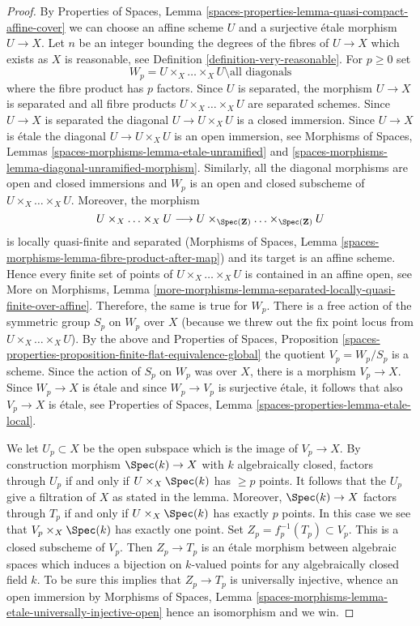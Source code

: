 \begin{proof}
By Properties of Spaces, Lemma
\ref{spaces-properties-lemma-quasi-compact-affine-cover}
we can choose an affine scheme $U$ and a surjective \'etale
morphism $U \to X$. Let $n$ be an integer bounding the degrees of
the fibres of $U \to X$ which exists as $X$ is reasonable, see
Definition \ref{definition-very-reasonable}.
For $p \geq 0$ set
$$
W_p = U \times_X \ldots \times_X U \setminus \text{all diagonals}
$$
where the fibre product has $p$ factors. Since $U$ is separated,
the morphism $U \to X$ is separated and all fibre products
$U \times_X \ldots \times_X U$ are separated schemes. Since $U \to X$ is
separated the diagonal $U \to U \times_X U$ is a closed immersion. Since
$U \to X$ is \'etale the diagonal $U \to U \times_X U$ is an open
immersion, see Morphisms of Spaces, Lemmas
\ref{spaces-morphisms-lemma-etale-unramified} and
\ref{spaces-morphisms-lemma-diagonal-unramified-morphism}.
Similarly, all the diagonal morphisms are open and closed immersions and
$W_p$ is an open and closed subscheme of $U \times_X \ldots \times_X U$.
Moreover, the morphism
$$
U \times_X \ldots \times_X U \longrightarrow
U \times_{\Spec(\mathbf{Z})} \ldots \times_{\Spec(\mathbf{Z})} U
$$
is locally quasi-finite and separated (Morphisms of Spaces,
Lemma \ref{spaces-morphisms-lemma-fibre-product-after-map})
and its target is an affine scheme. Hence every finite set of points of
$U \times_X \ldots \times_X U$ is contained in an affine open, see
More on Morphisms, Lemma
\ref{more-morphisms-lemma-separated-locally-quasi-finite-over-affine}.
Therefore, the same is true for $W_p$.
There is a free action of the symmetric group $S_p$ on $W_p$ over $X$
(because we threw out the fix point locus from
$U \times_X \ldots \times_X U$). By the above and
Properties of Spaces, Proposition
\ref{spaces-properties-proposition-finite-flat-equivalence-global}
the quotient $V_p = W_p/S_p$ is a scheme. Since the action of
$S_p$ on $W_p$ was over $X$, there is a morphism $V_p \to X$.
Since $W_p \to X$ is \'etale and since $W_p \to V_p$ is surjective
\'etale, it follows that also $V_p \to X$ is \'etale, see
Properties of Spaces, Lemma \ref{spaces-properties-lemma-etale-local}.

\medskip\noindent
We let $U_p \subset X$ be the open subspace which is the
image of $V_p \to X$. By construction morphism $\Spec(k) \to X$ with
$k$ algebraically closed, factors through $U_p$ if and only if
$U \times_X \Spec(k)$ has $\geq p$ points. It follows that
the $U_p$ give a filtration of $X$ as stated in the lemma.
Moreover, $\Spec(k) \to X$ factors through $T_p$ if and only if
$U \times_X \Spec(k)$ has exactly $p$ points. In this case
we see that $V_p \times_X \Spec(k)$ has exactly one point. Set
$Z_p = f_p^{-1}(T_p) \subset V_p$. This is a closed subscheme of $V_p$.
Then $Z_p \to T_p$ is an \'etale morphism between
algebraic spaces which induces a bijection on $k$-valued
points for any algebraically closed field $k$. To be sure this
implies that $Z_p \to T_p$ is universally injective, whence an
open immersion by
Morphisms of Spaces, Lemma
\ref{spaces-morphisms-lemma-etale-universally-injective-open}
hence an isomorphism and we win.
\end{proof}

